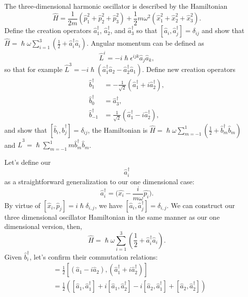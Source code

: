 \documentclass[../qft-for-the-gifted-amateur.tex]{subfiles}
\begin{document}
\begin{questions}
	\question The three-dimensional harmonic oscillator is described by the
	Hamiltonian
	\[
	\hat{H} = \frac{1}{2m}({\hat{p}}_{1}^{2} + {\hat{p}}_{2}^{2} + {\hat{p}}_{3}^{2}) + \frac{1}{2}m\omega^{2}({\hat{x}}_{1}^{2} + {\hat{x}}_{2}^{2} + {\hat{x}}_{3}^{2}).
	\]
	Define the creation operators ${\hat{a}}_{1}^{\dagger}$, ${\hat{a}}_{2}^{\dagger}$, and ${\hat{a}}_{3}^{\dagger}$ so that $[{\hat{a}}_{i},{\hat{a}}_{j}^{\dagger}] = \delta_{ij}$ and show that $\hat{H} = \hslash\omega\sum_{i = 1}^{3}(\frac{1}{2} + {\hat{a}}_{i}^{\dagger}{\hat{a}}_{i})$. Angular momentum can be defined as
	\[
	{\hat{L}}^{i} = - i\hslash\epsilon^{ijk}{\hat{a}}_{j}{\hat{a}}_{k},
	\]
	so that for example ${\hat{L}}^{3} = - i\hslash({\hat{a}}_{1}^{\dagger}{\hat{a}}_{2} - {\hat{a}}_{2}^{\dagger}{\hat{a}}_{1})$. Define new creation operators
	\begin{align*}
	{\hat{b}}_{1}^{\dagger} &= -\frac{1}{\sqrt{2}}({\hat{a}}_{1}^{\dagger} + i{\hat{a}}_{2}^{\dagger}), \\
	{\hat{b}}_{0}^{\dagger} &= {\hat{a}}_{3}^{\dagger}, \\
	{\hat{b}}_{- 1}^{\dagger} &= \frac{1}{\sqrt{2}}({\hat{a}}_{1}^{\dagger} - i{\hat{a}}_{2}^{\dagger}),
	\end{align*}
	and show that $[{\hat{b}}_{i},{\hat{b}}_{j}^{\dagger}] = \delta_{ij}$, the Hamiltonian is $\hat{H} = \hslash\omega\sum_{m = - 1}^{1}(\frac{1}{2} + {\hat{b}}_{m}^{\dagger}{\hat{b}}_{m})$ and ${\hat{L}}^{3} = \hslash\sum_{m = - 1}^{1}m{\hat{b}}_{m}^{\dagger}{\hat{b}}_{m}$.
	\begin{solution}
	Let's define our \[{\hat{a}}_{i}^{\dagger}\] as a straightforward generalization to our one dimensional case: 
	\[
	{\hat{a}}_{i}^{\dagger} = \Big(\hat{x_{i}} - \frac{i}{m\omega}\hat{p_{i}}\Big).
	\]
	By virtue of $[{\hat{x}}_{i},{\hat{p}}_{j}] = i\hslash\delta_{i,j}$, we have $[{\hat{a}}_{i},{\hat{a}}_{j}^{\dagger}] = \delta_{i,j}.$ We can construct our three dimensional oscillator Hamiltonian in the same manner as our one dimensional version, then,
	\[
	\hat{H} = \hslash\omega\overset{3}{\sum_{i = 1}}(\frac{1}{2} + {\hat{a}}_{i}^{\dagger}{\hat{a}}_{i}).
	\]
	Given ${\hat{b}}_{i}^{\dagger}$, let's confirm their commutation relations:
	\begin{align*}
		[{\hat{b}}_{1},{\hat{b}}_{1}^{\dagger}] &= \frac{1}{2}[({\hat{a}}_{1} - i{\hat{a}}_{2}),({\hat{a}}_{1}^{\dagger} + i{\hat{a}}_{2}^{\dagger})] \\
							&= \frac{1}{2}([{\hat{a}}_{1},{\hat{a}}_{1}^{\dagger}] + i[{\hat{a}}_{1},{\hat{a}}_{2}^{\dagger}] - i[{\hat{a}}_{2},{\hat{a}}_{1}^{\dagger}] + [{\hat{a}}_{2},{\hat{a}}_{2}^{\dagger}]) \\

\end{align*}
\end{solution}
\end{questions}
\end{document}
